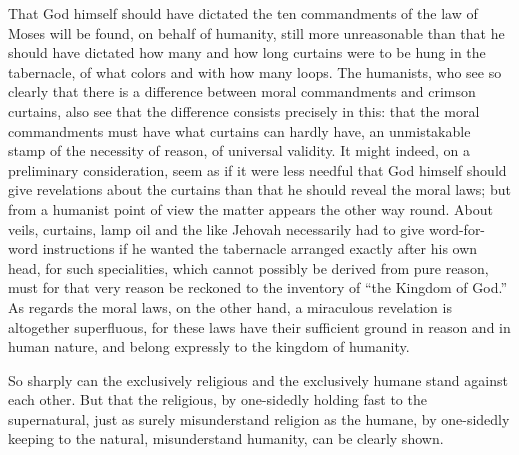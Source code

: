 \documentclass[12pt,a4paper,openany]{book}
\newcommand{\opage}[1]{\marginnote{\footnotesize\textit{[#1]}}}
\begin{document}
That God himself should have dictated the ten commandments of the law of
Moses will be found, on behalf of humanity, still more unreasonable than
that he should have dictated how many and how long curtains were to be
hung in the tabernacle, of what colors and with how many loops. The
humanists, who see so clearly that there is a difference between moral
commandments and crimson curtains, also see that the difference consists
precisely in this: that the moral commandments must have what curtains
can hardly have, an unmistakable stamp of the necessity of reason, of
universal validity. It might indeed, on a preliminary consideration, seem
as if it were less needful that God himself should give revelations about
the curtains than that he should reveal the moral laws; but from a
humanist point of view the matter appears the other way round. About
veils, curtains, lamp oil and the like Jehovah necessarily had to give
word-for-word instructions if he wanted the tabernacle arranged exactly
after his own head, for such specialities, which cannot possibly be
derived from pure reason, must for that very reason \opage{101}be reckoned to the
inventory of ``the Kingdom of God.'' As regards the moral laws, on the
other hand, a miraculous revelation is altogether superfluous, for these
laws have their sufficient ground in reason and in human nature, and
belong expressly to the kingdom of humanity.

So sharply can the exclusively religious and the exclusively humane
stand against each other. But that the religious, by one-sidedly holding
fast to the supernatural, just as surely misunderstand religion as the
humane, by one-sidedly keeping to the natural, misunderstand humanity,
can be clearly shown.
\end{document}
